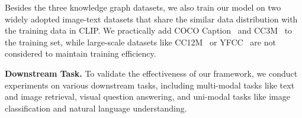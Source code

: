 Besides the three knowledge graph datasets, we also train our model on two widely adopted image-text datasets that share the similar data distribution with the training data in CLIP. We practically add COCO Caption~\cite{cococap} and CC3M~\cite{cc3m} to the training set, while large-scale datasets like CC12M~\cite{cc12m} or YFCC~\cite{yfcc} are not considered to maintain training efficiency.

\textbf{Downstream Task.} To validate the effectiveness of our framework, we conduct experiments on various downstream tasks, including multi-modal tasks like text and image retrieval, visual question answering, and uni-modal tasks like image classification and natural language understanding. 

